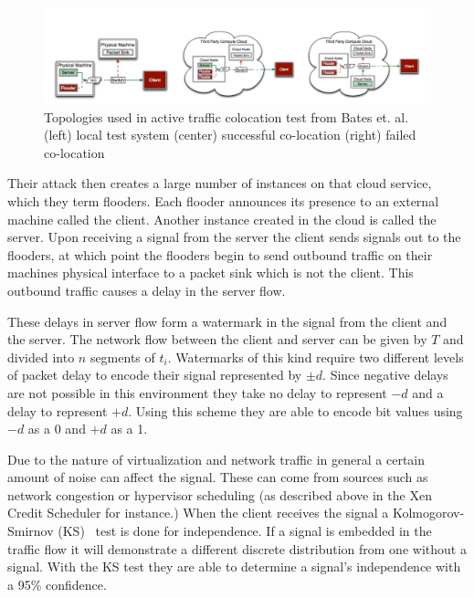 \begin{figure}\label{BatesNetworkThing}
	  \centering
	  \includegraphics[width=\textwidth]{figures/batesNetwork.png}
	  \caption{Topologies used in active traffic colocation test from Bates et. al. ~\cite{bates_detecting_2012}
	  (left) local test system 	(center) successful co-location   (right) failed co-location }
\end{figure}



Their attack then creates a large number of instances on that cloud service, which they term flooders. Each flooder announces its presence to an external machine called the client. Another instance created in the cloud is called the server. Upon receiving a signal from the server the client sends signals out to the flooders, at which point the flooders begin to send outbound traffic on their machines physical interface to a packet sink which is not the client. This outbound traffic causes a delay in the server flow. 

These delays in server flow form a watermark in the signal from the client and the server. The network flow between the client and server can be given by $T$ and divided into $n$ segments of $t_i$. Watermarks of this kind require two different levels of packet delay to encode their signal represented by $\pm d$. Since negative delays are not possible in this environment they take no delay to represent $-d$ and a delay to represent $+d$. Using this scheme they are able to encode bit values using $-d$ as a 0 and $+d$ as a 1. 

Due to the nature of virtualization and network traffic in general a certain amount of noise can affect the signal. These can come from sources such as network congestion or hypervisor scheduling (as described above in the Xen Credit Scheduler for instance.) When the client receives the signal a Kolmogorov-Smirnov (KS)~\cite{pettitt_kolmogorov-smirnov_1977} test is done for independence. If a signal is embedded in the traffic flow it will demonstrate a different discrete distribution from one without a signal. With the KS test they are able to determine a signal's independence with a 95\% confidence. 

